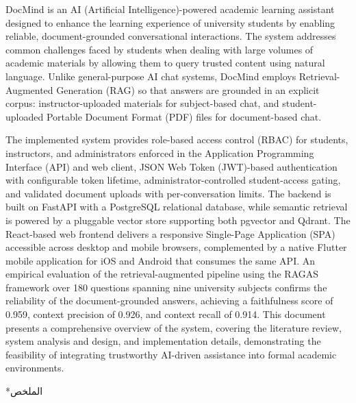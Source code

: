 \documentclass[12pt, a4paper, oneside]{report}
\makeatletter
\newcommand{\chapformat}[1]{%
  \centering
  {\fontsize{14}{17}\selectfont\itshape\addfontfeatures{LetterSpace=3.5}%
    \MakeUppercase{\chaptertitlename}\ \thechapter}\\[24pt]%
  {\fontsize{16}{19}\selectfont\bfseries\addfontfeatures{LetterSpace=0}%
    \MakeUppercase{#1}}%
}
\newcommand{\chapformatstar}[1]{%
  \centering
  {\fontsize{16}{19}\selectfont\bfseries\MakeUppercase{#1}}%
}
\newcommand{\chapterstar}[1]{%
  \clearpage
  \phantomsection
  \edef\@saved@chapcount{\the\value{chapter}}%
  \titleformat{\chapter}[block]{}{}%
    {0pt}{\chapformatstar}%
  \@originalchapter*{#1}%
  \setcounter{chapter}{\@saved@chapcount}%
  \titleformat{\chapter}[block]{}{}%
    {0pt}{\chapformat}%
}
\let\@originalchapter\chapter
\renewcommand{\chapter}{%
  \@ifstar{\chapterstar}{\@originalchapter}%
}
\makeatother
\begin{document}
DocMind is an AI (Artificial Intelligence)-powered academic learning assistant designed to enhance the learning experience of university students by enabling reliable, document-grounded conversational interactions. The system addresses common challenges faced by students when dealing with large volumes of academic materials by allowing them to query trusted content using natural language. Unlike general-purpose AI chat systems, DocMind employs Retrieval-Augmented Generation (RAG) so that answers are grounded in an explicit corpus: instructor-uploaded materials for subject-based chat, and student-uploaded Portable Document Format (PDF) files for document-based chat.

The implemented system provides role-based access control (RBAC) for students, instructors, and administrators enforced in the Application Programming Interface (API) and web client, JSON Web Token (JWT)-based authentication with configurable token lifetime, administrator-controlled student-access gating, and validated document uploads with per-conversation limits. The backend is built on FastAPI with a PostgreSQL relational database, while semantic retrieval is powered by a pluggable vector store supporting both pgvector and Qdrant. The React-based web frontend delivers a responsive Single-Page Application (SPA) accessible across desktop and mobile browsers, complemented by a native Flutter mobile application for iOS and Android that consumes the same API. An empirical evaluation of the retrieval-augmented pipeline using the RAGAS framework over 180 questions spanning nine university subjects confirms the reliability of the document-grounded answers, achieving a faithfulness score of 0.959, context precision of 0.926, and context recall of 0.914. This document presents a comprehensive overview of the system, covering the literature review, system analysis and design, and implementation details, demonstrating the feasibility of integrating trustworthy AI-driven assistance into formal academic environments.

\clearpage

\chapter*{\textarabic{الملخص}}
\end{document}
